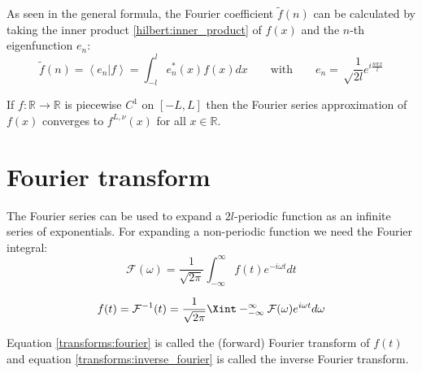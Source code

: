     \begin{formula}
		As seen in the general formula, the Fourier coefficient $\widetilde{f}(n)$ can be calculated by taking the inner product \ref{hilbert:inner_product} of $f(x)$ and the $n$-th eigenfunction $e_n$:
		\begin{equation}
			\label{transforms:fourier_coefficients}
        		\widetilde{f}(n) = \left\langle e_n|f\right\rangle = \int_{-l}^le_n^*(x)f(x)dx \qquad\text{with}\qquad e_n = \sqrt\frac{1}{2l}e^{i\frac{n\pi x}{l}}
		\end{equation}
	\end{formula}
    
    \begin{theorem}
    	If $f:\mathbb{R}\rightarrow\mathbb{R}$ is piecewise $C^1$ on $[-L, L]$ then the Fourier series approximation of $f(x)$ converges to $f^{L, \nu}(x)$ for all $x\in\mathbb{R}$.
    \end{theorem}

\section{Fourier transform}
	
	The Fourier series can be used to expand a $2l$-periodic function as an infinite series of exponentials. For expanding a non-periodic function we need the Fourier integral: 
	\begin{equation}
		\label{transforms:fourier}
	        \boxed{\mathcal{F}(\omega) = \frac{1}{\sqrt{2\pi}} \int_{-\infty}^{\infty}f(t)e^{-i\omega t}dt}
	\end{equation}
    
	\begin{equation}
		\label{transforms:inverse_fourier}
	        f(t) = \mathcal{F}^{-1}(t) = \frac{1}{\sqrt{2\pi}} \Xint-_{-\infty}^{\infty}\mathcal{F}(\omega)e^{i\omega t}d\omega
	\end{equation}
    
	Equation \ref{transforms:fourier} is called the (forward) Fourier transform of $f(t)$ and equation \ref{transforms:inverse_fourier} is called the inverse Fourier transform.
    
